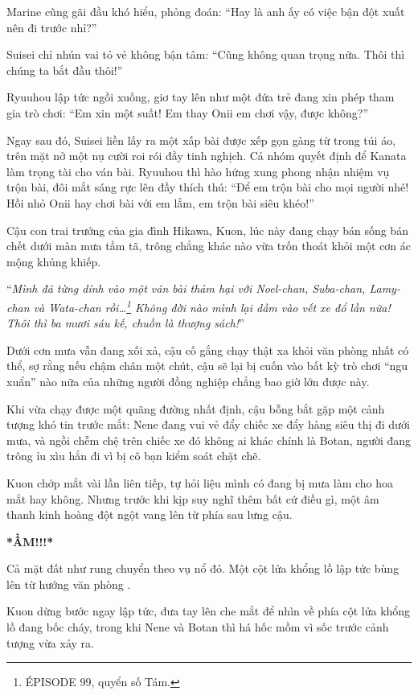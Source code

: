 \documentclass[../main.tex]{subfiles}
\begin{document}
Marine cũng gãi đầu khó hiểu, phỏng đoán: ``Hay là anh ấy có việc bận đột xuất nên đi trước nhỉ?''

Suisei chỉ nhún vai tỏ vẻ không bận tâm: ``Cũng không quan trọng nữa. Thôi thì chúng ta bắt đầu thôi!''

Ryuuhou lập tức ngồi xuống, giơ tay lên như một đứa trẻ đang xin phép tham gia trò chơi: ``Em xin một suất! Em thay Onii em chơi vậy, được không?''

Ngay sau đó, Suisei liền lấy ra một xấp bài được xếp gọn gàng từ trong túi áo, trên mặt nở một nụ cười roi rói đầy tinh nghịch. Cả nhóm quyết định để Kanata làm trọng tài cho ván bài. Ryuuhou thì hào hứng xung phong nhận nhiệm vụ trộn bài, đôi mắt sáng rực lên đầy thích thú: ``Để em trộn bài cho mọi người nhé! Hồi nhỏ Onii hay chơi bài với em lắm, em trộn bài siêu khéo!''

\ct

Cậu con trai trưởng của gia đình Hikawa, Kuon, lúc này đang chạy bán sống bán chết dưới màn mưa tầm tã, trông chẳng khác nào vừa trốn thoát khỏi một cơn ác mộng khủng khiếp.

``\textit{Mình đã từng dính vào một ván bài thảm hại với Noel-chan, Suba-chan, Lamy-chan và Wata-chan rồi\dots\footnote{{\flaregothic ÉPISODE 99}, quyển số Tám.} Không đời nào mình lại dẫm vào vết xe đổ lần nữa! Thôi thì ba mươi sáu kế, chuồn là thượng sách!}''

Dưới cơn mưa vẫn đang xối xả, cậu cố gắng chạy thật xa khỏi văn phòng nhất có thể, sợ rằng nếu chậm chân một chút, cậu sẽ lại bị cuốn vào bất kỳ trò chơi ``ngu xuẩn'' nào nữa của những người đồng nghiệp chẳng bao giờ lớn được này.

Khi vừa chạy được một quãng đường nhất định, cậu bỗng bắt gặp một cảnh tượng khó tin trước mắt: Nene đang vui vẻ đẩy chiếc xe đẩy hàng siêu thị đi dưới mưa, và ngồi chễm chệ trên chiếc xe đó không ai khác chính là Botan, người đang trông ỉu xìu hẳn đi vì bị cô bạn kiểm soát chặt chẽ.

Kuon chớp mắt vài lần liên tiếp, tự hỏi liệu mình có đang bị mưa làm cho hoa mắt hay không. Nhưng trước khi kịp suy nghĩ thêm bất cứ điều gì, một âm thanh kinh hoàng đột ngột vang lên từ phía sau lưng cậu.

  {\Huge \textbf{*ẦM!!!*}}

Cả mặt đất như rung chuyển theo vụ nổ đó. Một cột lửa khổng lồ lập tức bùng lên từ hướng văn phòng \hll.

Kuon dừng bước ngay lập tức, đưa tay lên che mắt để nhìn về phía cột lửa khổng lồ đang bốc cháy, trong khi Nene và Botan thì há hốc mồm vì sốc trước cảnh tượng vừa xảy ra.
\end{document}
